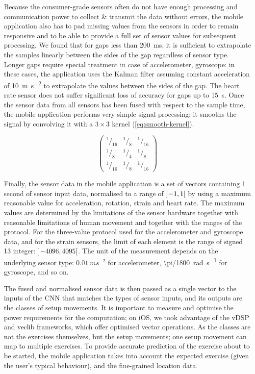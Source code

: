 \documentclass[a4paper, 10 pt, conference]{IEEEtran}
\begin{document}
Because the consumer-grade sensors often do not have enough processing and communication power to collect \& transmit the data without errors, the mobile application also has to pad missing values from the sensors in order to remain responsive and to be able to provide a full set of sensor values for subsequent processing. We found that for gaps less than \SI{200}{\milli\second}, it is sufficient to extrapolate the samples linearly between the sides of the gap regardless of sensor type. Longer gaps require special treatment in case of accelerometer, gyroscope: in these cases, the application uses the Kalman filter assuming constant acceleration of \SI{10}{\meter\second^{-2}} to extrapolate the values between the sides of the gap. The heart rate sensor does not suffer significant loss of accuracy for gaps up to \SI{15}{\second}. Once the sensor data from all sensors has been fused with respect to the sample time, the mobile application performs very simple signal processing: it smooths the signal by convolving it with a $3 \times 3$ kernel (\autoref{eq:smooth-kernel}).

\begin{equation} \label{eq:smooth-kernel}
	\begin{pmatrix}
	  ^1/_{16} & ^1/_8 & ^1/_{16} \\
	  ^1/_8    & ^1/_4 & ^1/_8    \\
	  ^1/_{16} & ^1/_8 & ^1/_{16}
	\end{pmatrix}
\end{equation}

Finally, the sensor data in the mobile application is a set of vectors containing 1 second of sensor input data, normalised to a range of $\interval[open]{-1}{1}$ by using a maximum reasonable value for acceleration, rotation, strain and heart rate. The maximum values are determined by the limitations of the sensor hardware together with reasonable limitations of human movement and together with the ranges of the protocol. For the three-value protocol used for the accelerometer and gyroscope data, and for the strain sensors, the limit of each element is the range of signed \SI{13}{\bit} integer: $\interval[open]{-4096}{4095}$. The unit of the measurement depends on the underlying sensor type: $0.01\ ms^{-2}$ for accelerometer, \SI{\pi/1800}{\radian\per\second} for gyroscope, and so on.

The fused and normalised sensor data is then passed as a single vector to the inputs of the CNN that matches the types of sensor inputs, and its outputs are the classes of setup movements. It is important to measure and optimise the power requirements for the computation; on iOS, we took advantage of the vDSP and veclib frameworks, which offer optimised vector operations. As the classes are not the exercises themselves, but the setup movements; one setup movement can map to multiple exercises. To provide accurate prediction of the exercise about to be started, the mobile application takes into account the expected exercise (given the user's typical behaviour), and the fine-grained location data. 
\end{document}
